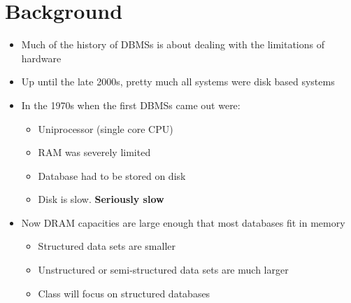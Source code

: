 \documentclass[11pt]{article}
\begin{document}
\maketitle
\thispagestyle{plain}

\section{Background}
\begin{itemize}
    \item Much of the history of DBMSs is about dealing with the limitations of hardware
    \item Up until the late 2000s, pretty much all systems were disk based systems
    \item In the 1970s when the first DBMSs came out were:
    \begin{itemize}
        \item Uniprocessor (single core CPU)
        \item RAM was severely limited
        \item Database had to be stored on disk
        \item Disk is slow. \textbf{Seriously slow}
    \end{itemize}
    \item Now DRAM capacities are large enough that most databases fit in memory
    \begin{itemize}
        \item Structured data sets are smaller
        \item Unstructured or semi-structured data sets are much larger
        \item Class will focus on structured databases
    \end{itemize}

\end{itemize}
\end{document}
